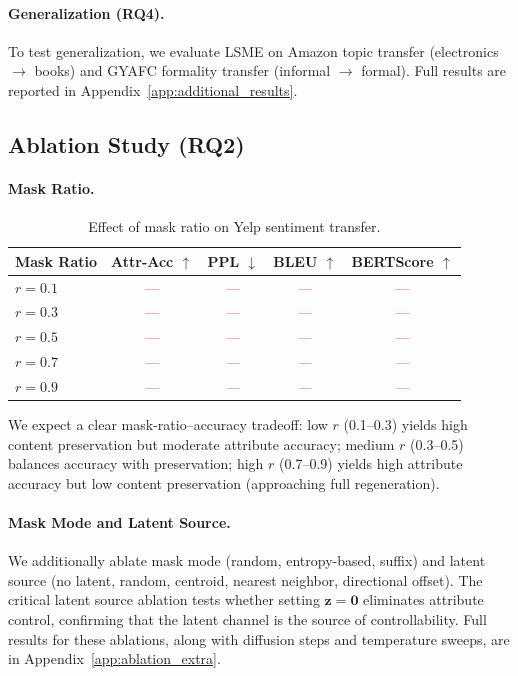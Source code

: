\documentclass{article}
\newcommand{\tbd}[1]{\textcolor{red}{#1}}  %
\begin{document}
\paragraph{Generalization (RQ4).}
To test generalization, we evaluate LSME on Amazon topic transfer (electronics $\to$ books) and GYAFC formality transfer (informal $\to$ formal).
Full results are reported in Appendix~\ref{app:additional_results}.

\subsection{Ablation Study (RQ2)}
\label{sec:ablation}


\paragraph{Mask Ratio.}

\begin{table}[t]
\centering
\caption{Effect of mask ratio on Yelp sentiment transfer.}
\label{tab:ablation_mask_ratio}
\small
\begin{tabular}{lcccc}
\toprule
\textbf{Mask Ratio} & \textbf{Attr-Acc} $\uparrow$ & \textbf{PPL} $\downarrow$ & \textbf{BLEU} $\uparrow$ & \textbf{BERTScore} $\uparrow$ \\
\midrule
$r = 0.1$ & \tbd{---} & \tbd{---} & \tbd{---} & \tbd{---} \\
$r = 0.3$ & \tbd{---} & \tbd{---} & \tbd{---} & \tbd{---} \\
$r = 0.5$ & \tbd{---} & \tbd{---} & \tbd{---} & \tbd{---} \\
$r = 0.7$ & \tbd{---} & \tbd{---} & \tbd{---} & \tbd{---} \\
$r = 0.9$ & \tbd{---} & \tbd{---} & \tbd{---} & \tbd{---} \\
\bottomrule
\end{tabular}
\end{table}

We expect a clear mask-ratio--accuracy tradeoff:
low $r$ (0.1--0.3) yields high content preservation but moderate attribute accuracy;
medium $r$ (0.3--0.5) balances accuracy with preservation;
high $r$ (0.7--0.9) yields high attribute accuracy but low content preservation (approaching full regeneration).

\paragraph{Mask Mode and Latent Source.}
We additionally ablate mask mode (random, entropy-based, suffix) and latent source (no latent, random, centroid, nearest neighbor, directional offset).
The critical latent source ablation tests whether setting $\mathbf{z} = \mathbf{0}$ eliminates attribute control, confirming that the latent channel is the source of controllability.
Full results for these ablations, along with diffusion steps and temperature sweeps, are in Appendix~\ref{app:ablation_extra}.
\end{document}
